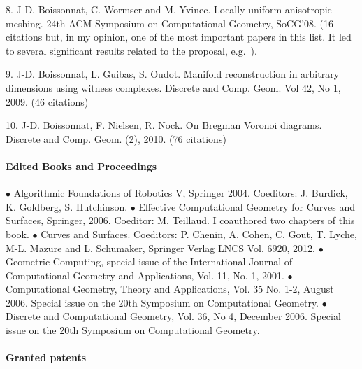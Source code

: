 8. J-D. Boissonnat, C. Wormser and M. Yvinec. Locally uniform anisotropic meshing. 
24th ACM Symposium on Computational Geometry, SoCG'08.
(16 citations but,  in my opinion, one of the most important papers in this list. It  led to several significant results related to the proposal, e.g.~\cite{geometrica-7142i}).

9. J-D. Boissonnat, L. Guibas, S. Oudot. Manifold reconstruction in arbitrary dimensions using witness complexes.
Discrete and Comp. Geom. Vol 42, No 1, 2009. (46 citations)


10. J-D. Boissonnat, F. Nielsen, R. Nock. On Bregman Voronoi diagrams.
Discrete and Comp. Geom. (2), 2010. (76 citations)%



\paragraph{Edited Books and Proceedings}  \mbox{}

$\bullet$
Algorithmic Foundations of Robotics V, Springer 2004. Coeditors:  J. Burdick, 
K. Goldberg, S. Hutchinson.
$\bullet$ Effective Computational Geometry for Curves and Surfaces,
  Springer, 2006. Coeditor:  M. Teillaud. I coauthored two chapters of this book.
$\bullet$  Curves and Surfaces.
Coeditors:  P. Chenin, A. Cohen,  C. Gout, T. Lyche, M-L.  Mazure and L. Schumaker,
Springer Verlag LNCS Vol. 6920, 2012.
$\bullet$
Geometric Computing, special issue of the 
International Journal of Computational Geometry and Applications, Vol. 11, 
No. 1, 2001.
$\bullet$
Computational Geometry, Theory and Applications, Vol. 35 No. 1-2, August 2006.
Special issue on the 20th Symposium on Computational
Geometry.  %
$\bullet$ 
Discrete and Computational Geometry, Vol. 36, No 4, December 2006.
Special issue on the 20th Symposium on Computational
Geometry.  %



\paragraph{Granted patents} \mbox{}

